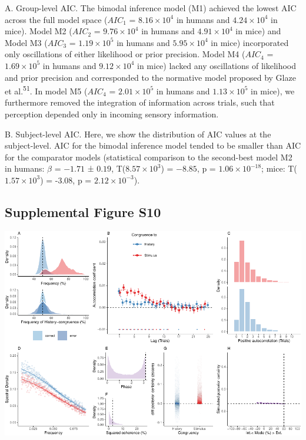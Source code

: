 \documentclass[
]{article}
\begin{document}
A. Group-level AIC. The bimodal inference model (M1) achieved the lowest
AIC across the full model space (\(AIC_1\) =
\(\ensuremath{8.16\times 10^{4}}\) in humans and
\(\ensuremath{4.24\times 10^{4}}\) in mice). Model M2 (\(AIC_2\) =
\(\ensuremath{9.76\times 10^{4}}\) in humans and
\(\ensuremath{4.91\times 10^{4}}\) in mice) and Model M3 (\(AIC_3\) =
\(\ensuremath{1.19\times 10^{5}}\) in humans and
\(\ensuremath{5.95\times 10^{4}}\) in mice) incorporated only
oscillations of either likelihood or prior precision. Model M4
(\(AIC_4\) = \(\ensuremath{1.69\times 10^{5}}\) in humans and
\(\ensuremath{9.12\times 10^{4}}\) in mice) lacked any oscillations of
likelihood and prior precision and corresponded to the normative model
proposed by Glaze et al.\textsuperscript{51}. In model M5 (\(AIC_4\) =
\(\ensuremath{2.01\times 10^{5}}\) in humans and
\(\ensuremath{1.13\times 10^{5}}\) in mice), we furthermore removed the
integration of information across trials, such that perception depended
only in incoming sensory information.

B. Subject-level AIC. Here, we show the distribution of AIC values at
the subject-level. AIC for the bimodal inference model tended to be
smaller than AIC for the comparator models (statistical comparison to
the second-best model M2 in humans: \(\beta\) = \(-1.71\) ± \(0.19\),
T(\(\ensuremath{8.57\times 10^{3}}\)) = \(-8.85\), p =
\(\ensuremath{1.06\times 10^{-18}}\); mice:
T(\(\ensuremath{1.57\times 10^{3}}\)) = -3.08, p =
\(\ensuremath{2.12\times 10^{-3}}\)).

\newpage

\hypertarget{supplemental-figure-s10}{%
\subsection{Supplemental Figure S10}\label{supplemental-figure-s10}}

\includegraphics{modes_mouse_rev1b_clean_files/figure-latex/Supplemental_Figure_S10-1.pdf}
\end{document}

